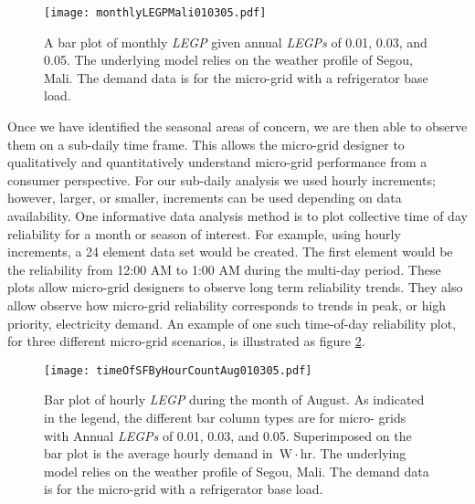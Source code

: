 \documentclass{article}
\newcommand{\unit}[1]{\ensuremath{\, \mathrm{#1}}}
\begin{document}

\begin{figure}[ht] 
  \centering
    \texttt{[image: monthlyLEGPMali010305.pdf]}
  \caption{A bar plot of monthly \emph{LEGP} given annual \emph{LEGPs} of 0.01, 0.03, and 0.05. 
  The underlying model relies on the weather profile of Segou, Mali.
  The demand data is for the micro-grid with a refrigerator base load. }
\label{MonthBar}
\end{figure}


Once we have identified the seasonal areas of concern, we are then able to observe them on a sub-daily time frame. 
This allows the micro-grid designer to qualitatively and quantitatively understand micro-grid performance from a consumer perspective. 
For our sub-daily analysis we used hourly increments; however, larger, or smaller, increments can be used depending on data availability.
%
%
One informative data analysis method is to plot collective time of day reliability for a month or season of interest. 
For example, using hourly increments, a 24 element data set would be created.
The first element would be the reliability from 12:00 AM to 1:00 AM during the multi-day period.
These plots allow micro-grid designers to observe long term reliability trends.
They also allow observe how micro-grid reliability corresponds to trends in peak, or high priority, electricity demand. 
An example of one such time-of-day reliability plot, for three different micro-grid scenarios, is illustrated as figure \ref{HourBar}.


\begin{figure}[ht] 
  \centering
    \texttt{[image: timeOfSFByHourCountAug010305.pdf]}
  \caption{Bar plot of hourly \emph{LEGP} during the month of August. 
  As indicated in the legend, the different bar column types are for micro-	
  grids with Annual \emph{LEGPs} of 0.01, 0.03, and 0.05.
  Superimposed on the bar plot is the average hourly demand in \unit{W\! \cdot \! hr}.
  The underlying model relies on the weather profile of Segou, Mali.
  The demand data is for the micro-grid with a refrigerator base load.}
\label{HourBar}
\end{figure}

\end{document}

